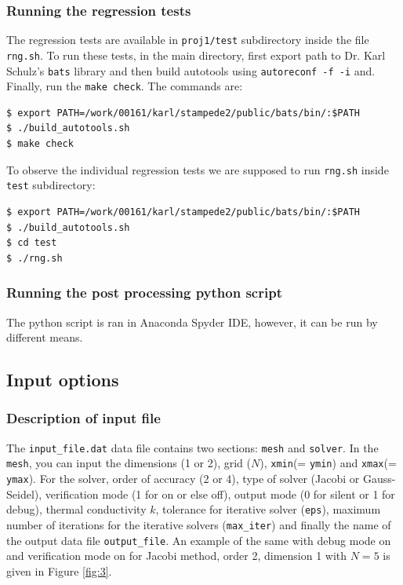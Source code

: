 \documentclass[12pt]{amsart}   %
\begin{document}
\subsubsection{Running the regression tests}
The regression tests are available in {\tt{proj1/test}} subdirectory inside the file {\tt{rng.sh}}. To run these tests, in the main directory, first export path to Dr. Karl Schulz's {\tt{bats}} library and then build autotools using {\tt{autoreconf -f -i}} and. Finally, run the {\tt{make check}}. The commands are:
\begin{lstlisting}
$ export PATH=/work/00161/karl/stampede2/public/bats/bin/:$PATH
$ ./build_autotools.sh
$ make check
\end{lstlisting}

To observe the individual regression tests we are supposed to run {\tt{rng.sh}} inside {\tt{test}} subdirectory:
\begin{lstlisting}
$ export PATH=/work/00161/karl/stampede2/public/bats/bin/:$PATH
$ ./build_autotools.sh
$ cd test
$ ./rng.sh
\end{lstlisting}

\subsubsection{Running the post processing python script}
The python script is ran in Anaconda Spyder IDE, however, it can be run by different means.

\subsection{Input options}
\subsubsection{Description of input file} The {\tt{input\_file.dat}} data file contains two sections:  {\tt{mesh}} and  {\tt{solver}}. In the  {\tt{mesh}}, you can input the dimensions (1 or 2), grid ($N$), {\tt{xmin}}(= {\tt{ymin}})  and  {\tt{xmax}}(= {\tt{ymax}}). 
For the solver, order of accuracy (2 or 4), type of solver (Jacobi or Gauss-Seidel), verification mode (1 for on or else off), output mode (0 for silent or 1 for debug), thermal conductivity $k$, tolerance for iterative solver ({\tt{eps}}), maximum number of iterations for the iterative solvers ({\tt{max\_iter}}) and finally the name of the output data file  {\tt{output\_file}}. An example of the same with debug mode on and verification mode on for Jacobi method, order 2, dimension 1 with $N=5$ is given in Figure \ref{fig:3}.
\end{document}
